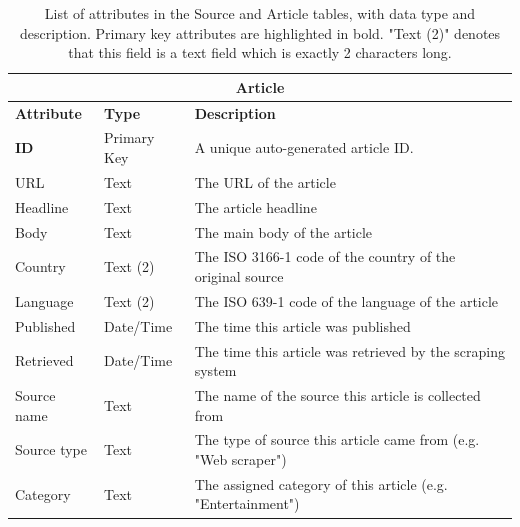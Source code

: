 \documentclass{l4proj}
\begin{document}
\begin{table}[h]
\begin{tabular}{lll}
\multicolumn{3}{c}{\textbf{Article}}                                                                                                                                     \\ \hline
\textbf{Attribute} & \textbf{Type} & \textbf{Description}                                                                                                                \\ \hline
\textbf{ID}        & Primary Key   & A unique auto-generated article ID.                                                                                                 \\
URL                & Text          & The URL of the article                                                                                                              \\
Headline           & Text          & The article headline                                                                                                                \\
Body               & Text          & The main body of the article                                                                                                        \\
Country            & Text (2)      & The ISO 3166-1 code of the country of the original source                                                                           \\
Language           & Text (2)      & The ISO 639-1 code of the language of the article                                                                                   \\
Published          & Date/Time     & The time this article was published                                                                                                 \\
Retrieved          & Date/Time     & The time this article was retrieved by the scraping system                                                                          \\
Source name        & Text          & The name of the source this article is collected from                                                                               \\
Source type        & Text          & The type of source this article came from (e.g. "Web scraper")                                                                      \\
Category           & Text          & The assigned category of this article (e.g. "Entertainment")                                                                        \\ \hline
\end{tabular}
\caption{List of attributes in the Source and Article tables, with data type and description. Primary key attributes are highlighted in bold. "Text (2)" denotes that this field is a text field which is exactly 2 characters long.}
\label{table:schema}
\end{table}
\end{document}
